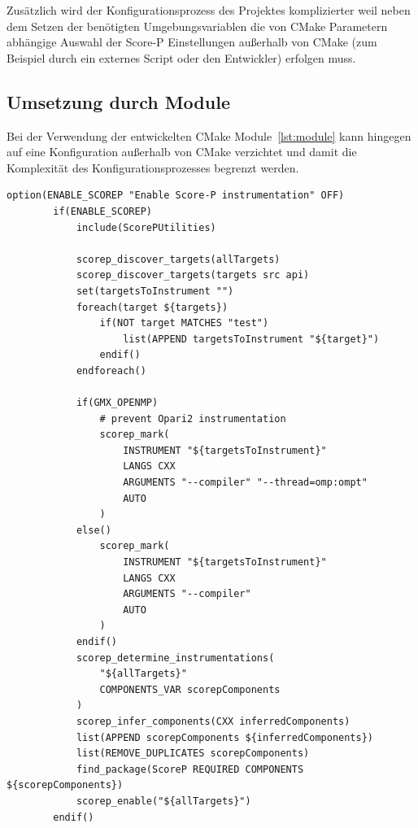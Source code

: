 \documentclass[german,proseminar,hyperref,utf8]{zihpub}
\begin{document}
    Zusätzlich wird der Konfigurationsprozess des Projektes komplizierter weil neben dem Setzen der
    benötigten Umgebungsvariablen die von CMake Parametern abhängige Auswahl der Score-P Einstellungen
    au{\ss}erhalb von CMake (zum Beispiel durch ein externes Script oder den Entwickler) erfolgen muss.

    \subsection{Umsetzung durch Module}
    Bei der Verwendung der entwickelten CMake Module~\ref{lst:module} kann hingegen auf eine Konfiguration
    au{\ss}erhalb von CMake verzichtet und damit die Komplexität des Konfigurationsprozesses begrenzt werden.

    \begin{lstlisting}[caption=Anwendung der entwickelten Module bei GROMACS, gobble=8, label=lst:module]
        option(ENABLE_SCOREP "Enable Score-P instrumentation" OFF)
        if(ENABLE_SCOREP)
            include(ScorePUtilities)
        
            scorep_discover_targets(allTargets)
            scorep_discover_targets(targets src api)
            set(targetsToInstrument "")
            foreach(target ${targets})
                if(NOT target MATCHES "test")
                    list(APPEND targetsToInstrument "${target}")
                endif()
            endforeach()
            
            if(GMX_OPENMP)
                # prevent Opari2 instrumentation
                scorep_mark(
                    INSTRUMENT "${targetsToInstrument}"
                    LANGS CXX
                    ARGUMENTS "--compiler" "--thread=omp:ompt"
                    AUTO
                )
            else()
                scorep_mark(
                    INSTRUMENT "${targetsToInstrument}"
                    LANGS CXX
                    ARGUMENTS "--compiler"
                    AUTO
                )
            endif()
            scorep_determine_instrumentations(
                "${allTargets}"
                COMPONENTS_VAR scorepComponents
            )
            scorep_infer_components(CXX inferredComponents)
            list(APPEND scorepComponents ${inferredComponents})
            list(REMOVE_DUPLICATES scorepComponents)
            find_package(ScoreP REQUIRED COMPONENTS ${scorepComponents})
            scorep_enable("${allTargets}")
        endif()
    \end{lstlisting}
\end{document}
